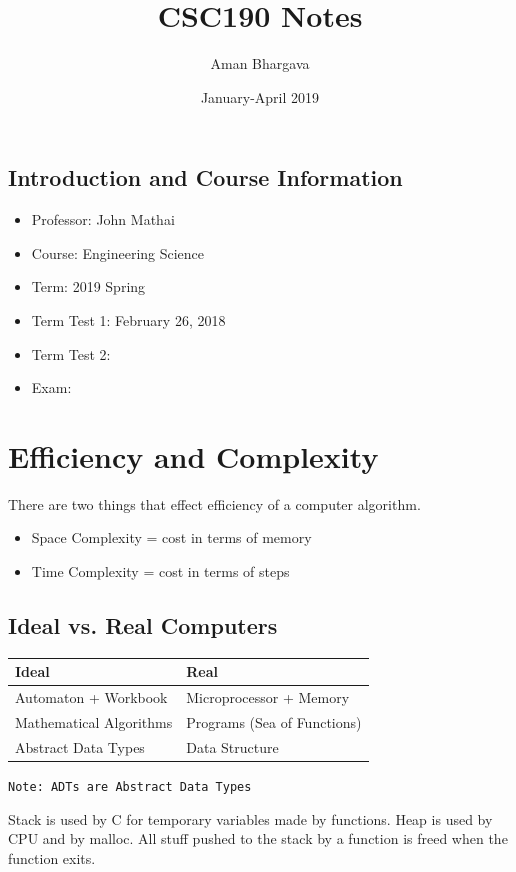 \documentclass[a4paper,12pt]{report}
\begin{document}
\title{CSC190 Notes}
\author{Aman Bhargava}
\date{January-April 2019}
\maketitle

\tableofcontents

\section{Introduction and Course Information}
\begin{itemize}
\item Professor: John Mathai
\item Course: Engineering Science
\item Term: 2019 Spring
\item Term Test 1: February 26, 2018
\item Term Test 2: 
\item Exam: 
\end{itemize}

\chapter{Efficiency and Complexity}
There are two things that effect efficiency of a computer algorithm.
\begin{itemize}
\item Space Complexity = cost in terms of memory
\item Time Complexity = cost in terms of steps
\end{itemize}

\section{Ideal vs. Real Computers}
\begin{tabular}{l|l}
Ideal & Real \\
\hline
Automaton + Workbook & Microprocessor + Memory \\
Mathematical Algorithms & Programs (Sea of Functions) \\
Abstract Data Types & Data Structure 
\end{tabular}

\texttt{Note: ADTs are Abstract Data Types}

Stack is used by C for temporary variables made by functions. Heap is used by CPU and by malloc. All stuff pushed to the stack by a function is freed when the function exits. 
\end{document}
